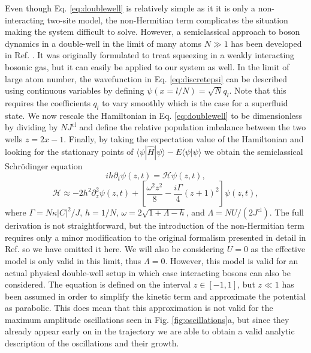Even though Eq. \eqref{eq:doublewell} is relatively simple as it it is
only a non-interacting two-site model, the non-Hermitian term
complicates the situation making the system difficult to
solve. However, a semiclassical approach to boson dynamics in a
double-well in the limit of many atoms $N \gg 1$ has been developed in
Ref. \cite{juliadiaz2012}. It was originally formulated to treat
squeezing in a weakly interacting bosonic gas, but it can easily be
applied to our system as well. In the limit of large atom number, the
wavefunction in Eq. \eqref{eq:discretepsi} can be described using
continuous variables by defining $\psi (x = l / N) = \sqrt{N}
q_l$. Note that this requires the coefficients $q_l$ to vary smoothly
which is the case for a superfluid state. We now rescale the
Hamiltonian in Eq. \eqref{eq:doublewell} to be dimensionless by
dividing by $NJ^\mathrm{cl}$ and define the relative population
imbalance between the two wells $z = 2x - 1$. Finally, by taking the
expectation value of the Hamiltonian and looking for the stationary
points of
$\langle \psi | \hat{H} | \psi \rangle - E \langle \psi | \psi
\rangle$ we obtain the semiclassical Schr\"{o}dinger equation
\begin{equation}
  \label{eq:semicl}
  i h \partial_t \psi(z, t) = \mathcal{H} \psi(z, t),
\end{equation}
\begin{equation}
  \label{eq:semiH}
  \mathcal{H} \approx -2 h^2 \partial^2_z \psi(z, t) + \left[
    \frac{\omega^2 z^2} {8} - \frac{i \Gamma} {4} \left( z + 1
    \right)^2 \right] \psi(z, t),
\end{equation}
where $\Gamma = N \kappa |C|^2 / J$, $h = 1/N$,
$\omega = 2 \sqrt{1 + \Lambda - h}$, and
$\Lambda = NU / (2J^\mathrm{cl})$. The full derivation is not
straightforward, but the introduction of the non-Hermitian term
requires only a minor modification to the original formalism presented
in detail in Ref. \cite{juliadiaz2012} so we have omitted it here. We
will also be considering $U = 0$ as the effective model is only valid
in this limit, thus $\Lambda = 0$. However, this model is valid for an
actual physical double-well setup in which case interacting bosons can
also be considered. The equation is defined on the interval
$z \in [-1, 1]$, but $z \ll 1$ has been assumed in order to simplify
the kinetic term and approximate the potential as parabolic. This does
mean that this approximation is not valid for the maximum amplitude
oscillations seen in Fig. \ref{fig:oscillations}a, but since they
already appear early on in the trajectory we are able to obtain a
valid analytic description of the oscillations and their growth.

